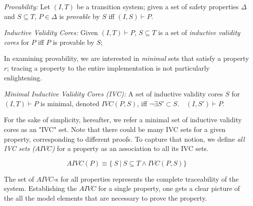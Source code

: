 
\begin{definition}{\emph{Provability:}}
Let $(I, T)$ be a transition system; given a set of safety properties $\Delta$ and $S \subseteq T$, $P \in \Delta$ is \emph{provable} by $S$ iff
$(I, S) \vdash P$.
\end{definition}

\begin{definition}{\emph{Inductive Validity Cores:}}
  \label{def:ivc}
  Given $(I, T)\vdash P$, $S \subseteq
  T$ is a set of {\em inductive validity cores} for $P$
  iff $P$ is provable by $S$;
\end{definition}

In examining provability, we are interested in {\em minimal} sets that satisfy a property $r$; tracing a property to the entire implementation        is not particularly enlightening.

\begin{definition}{\emph{Minimal Inductive Validity Cores (IVC):}}
  \label{def:minimal-ivc}
  A set of inductive validity cores $S$ for $(I, T)\vdash P$ is minimal, denoted $IVC(P, S)$, iff
  $\neg\exists S' \subset S .\quad (I, S') \vdash P $.
\end{definition}

For the sake of simplicity, hereafter, we refer a minimal set of inductive validity cores as an "IVC" set. 
Note that there could be many IVC sets for a given property, corresponding to different proofs. To capture that notion, we define \emph{all IVC sets ($AIVC$)} for a property as an association to all its IVC sets.

$$ AIVC(P) \equiv  \{\ S~|~S \subseteq T \land  IVC(P, S)\} $$

\noindent The set of $AIVC$-s for all properties represents the complete traceability of the system. Establishing the $AIVC$ for a single property, one gets a clear picture of the all the model elements that are necessary to prove the property.

